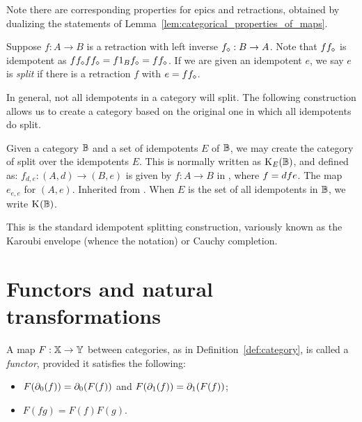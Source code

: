 Note there are corresponding properties for epics and retractions, obtained by dualizing the
statements of Lemma~\ref{lem:categorical_properties_of_maps}.

Suppose $f:A \to B$ is a retraction with left inverse ${f}_\diamond:B \to A$. Note that $f
{f}_\diamond$ is idempotent as $f {f}_\diamond f {f}_\diamond = f 1_B {f}_\diamond = f
{f}_\diamond$. If we are given an idempotent $e$, we say $e$ is \emph{split} if there is a
retraction $f$ with $e = f {f}_\diamond$.

In general, not all idempotents in a category will split. The following construction allows us to
create a category based on the original one in which all idempotents do split.

\begin{definition}\label{def:split_category}
  Given a category $\mathbb{B}$ and a set of idempotents $E$ of $\mathbb{B}$, we may create the category of \B split
  over the idempotents $E$. This is normally written as $\text{K}_{E}(\mathbb{B})$, and defined as:
    {$f_{d,e}:(A,d)\to(B,e)$ is given by $f:A\to B$ in \B, where $f = d\hspace{0.1pt} f e$.}
    {The map $e_{e,e}$ for $(A,e)$.}
    {Inherited from \B.}
  When $E$ is the set of all idempotents in $\mathbb{B}$, we write $\text{K}_{}(\mathbb{B})$.
\end{definition}
This is the standard idempotent splitting construction, variously known as the Karoubi
envelope (whence the notation) or Cauchy completion.


\section{Functors and natural transformations} %
\label{ssub:functors_and_natural_transformations}

\begin{definition}\label{def:functor}
  A map $F:\mathbb{X} \to \mathbb{Y}$ between categories, as in Definition~\ref{def:category}, is called a
  \emph{functor}, provided it satisfies the following:
  \begin{itemize}
    \item[\axiom{F}{1}] $F(\partial_0({f})) = \partial_0({F(f)})$ and $F(\partial_1({f})) = \partial_1({F(f)})$;
    \item[\axiom{F}{2}] $F(f g) = F(f)F(g)$.
  \end{itemize}
\end{definition}

